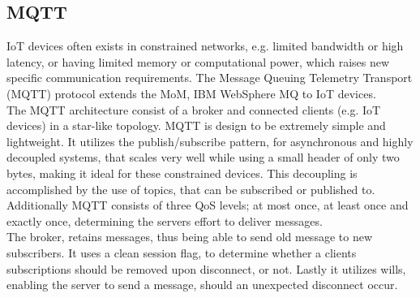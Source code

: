 \subsection{MQTT}
IoT devices often exists in constrained networks, e.g. limited bandwidth or high latency, or having limited memory or computational power, which raises new specific communication requirements. The Message Queuing Telemetry Transport (MQTT) protocol extends the MoM, IBM WebSphere MQ to IoT devices.\\

The MQTT architecture consist of a broker and connected clients (e.g. IoT devices) in a star-like topology. MQTT is design to be extremely simple and lightweight. It utilizes the publish/subscribe pattern, for asynchronous and highly decoupled systems, that scales very well while using a small header of only two bytes, making it ideal for these constrained devices. This decoupling is accomplished by the use of topics, that can be subscribed or published to. Additionally MQTT consists of three QoS levels; at most once, at least once and exactly once, determining the servers effort to deliver messages.\\

The broker, retains messages, thus being able to send old message to new subscribers. It uses a clean session flag, to determine whether a clients subscriptions should be removed upon disconnect, or not. Lastly it utilizes wills, enabling the server to send a message, should an unexpected disconnect occur.

